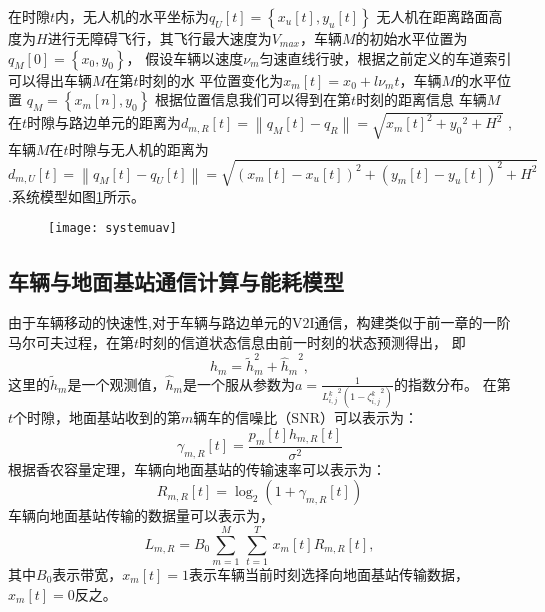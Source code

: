 在时隙$t$内，无人机的水平坐标为$q_U\left[t\right]=\left\{x_u\left[t\right],y_u\left[t\right]\right\}$
无人机在距离路面高度为$H$进行无障碍飞行，其飞行最大速度为$V_{max}$，车辆$M$的初始水平位置为$q_M\left[0\right]=\left\{x_0,y_0\right\}$，
假设车辆以速度$\nu_m$匀速直线行驶，根据之前定义的车道索引可以得出车辆$M$在第$t$时刻的水
平位置变化为$x_m\left[t\right]=x_0+l\nu_m t$，车辆$M$的水平位置 $q_M=\left\{x_m\left[n\right],y_0\right\}$
根据位置信息我们可以得到在第$t$时刻的距离信息
车辆$M$在$t$时隙与路边单元的距离为${{d}_{m,R}}\left[ t \right]=\left\| {{q}_{M}}\left[ t \right]-{{q}_{R}} \right\|=\sqrt{{{x}_{m}}{{\left[ t \right]}^{2}}+{{y}_{0}}^{2}+{{H}^{2}}}$
,车辆$M$在$t$时隙与无人机的距离为
$
{{d}_{m,U}}\left[ t \right]=\left\| {{q}_{M}}\left[ t \right]-{{q}_{U}}\left[ t \right] \right\|=\sqrt{{{\left( {{x}_{m}}\left[ t \right]-{{x}_{u}}\left[ t \right] \right)}^{2}}+{{\left( {{y}_{m}}\left[ t \right]-{{y}_{u}}\left[ t \right] \right)}^{2}}+{{H}^{2}}}\
$.系统模型如图\ref{systemuav}所示。
\begin{figure}[hptb!]
 \centering\small
 \texttt{[image: systemuav]}
 \label{systemuav}
\end{figure}

\subsection{车辆与地面基站通信计算与能耗模型}\label{section4-2-1}
由于车辆移动的快速性,对于车辆与路边单元的V2I通信，构建类似于前一章的一阶马尔可夫过程，在第$t$时刻的信道状态信息由前一时刻的状态预测得出，
即
\begin{equation} \label{E4-1}
h_{m}={\widetilde{h}}_{m}^2+{\hat{h}_{m}}^2,
\end{equation} \label{E4-2}
这里的${\widetilde{h}}_{m}$是一个观测值，${\hat{h}}_{m}$是一个服从参数为$a=\frac{1}{{L_{i,j}^k}^2({1-{\zeta_{i,j}^k}^2})}$的指数分布。
在第$t$个时隙，地面基站收到的第$m$辆车的信噪比（SNR）可以表示为：
\begin{equation}
\gamma_{m,R}\left[t\right]=\frac{p_m\left[t\right]h_{m,R}\left[t\right]}{\sigma^2}
\end{equation} \label{E4-3}
根据香农容量定理，车辆向地面基站的传输速率可以表示为：
\begin{equation}
R_{m,R}\left[t\right]=\log_2{\left(1+\gamma_{m,R}\left[t\right]\right)}
\end{equation}
车辆向地面基站传输的数据量可以表示为，
\begin{equation} \label{E4-4}
{{L}_{m,R}}={{B}_{0}}\underset{m=1}{\overset{M}{\mathop{\sum }}}\,\underset{t=1}{\overset{T}{\mathop{\sum }}}\,{{x}_{m}}\left[ t \right]R_{m,R}\left[t\right],
\end{equation}
其中$B_0$表示带宽，${{x}_{m}}\left[ t \right]=1$表示车辆当前时刻选择向地面基站传输数据，${{x}_{m}}\left[ t \right]=0$反之。


